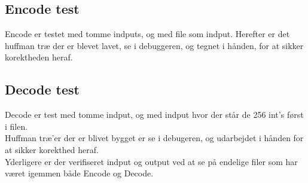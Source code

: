 \documentclass{article}
\begin{document}
\subsection*{Encode test}
Encode er testet med tomme indputs, og med file som indput.
Herefter er det huffman træ der er blevet lavet, se i debuggeren, og tegnet i hånden, for at sikker korektheden heraf.\\
\bigskip
\subsection*{Decode test}
Decode er test med tomme indput, og med indput hvor der står de 256 int's først i filen. \\
Huffman træ'er der er blivet bygget er se i debugeren, og udarbejdet i hånden for at sikker korekthed heraf.\\
Yderligere er der verifiseret indput og output ved at se på endelige filer som har været igemmen både Encode og Decode.
\end{document}
